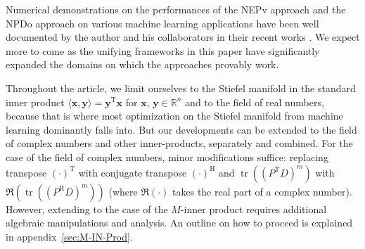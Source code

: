 \documentclass[11pt]{article}
\def\bx{\pmb{x}}
\def\by{\pmb{y}}
\def\bbR{\mathbb{R}}
\DeclareMathOperator{\tr}{tr}
\DeclareMathOperator{\HH}{H}
\DeclareMathOperator{\T}{T}
\theoremstyle{definition}
\numberwithin{equation}{section}
\begin{document}
Numerical demonstrations on the performances of the NEPv approach and the NPDo approach on various machine learning applications
have been well documented   by the author and his collaborators in
their recent works \cite{wazl:2023,wazl:2022a,zhys:2020,zhwb:2022}.
We expect more to come as the unifying frameworks in this paper have significantly expanded the domains on which the approaches provably work.

Throughout the article, we limit ourselves to the Stiefel manifold in the standard inner product
$\langle \bx,\by\rangle=\by^{\T}\bx$ for $\bx,\,\by\in\bbR^n$ and to the field of real numbers, because that is where
most optimization on the Stiefel manifold from machine learning dominantly falls into. But our developments can be extended to
the field of complex numbers and other inner-products, separately and combined.
For the case of the field of complex numbers, minor modifications suffice: replacing
        transpose $(\cdot)^{\T}$ with conjugate transpose $(\cdot)^{\HH}$ and  $\tr((P^{\T}D)^m)$ with $\Re(\tr((P^{\HH}D)^m))$
        (where $\Re(\cdot)$ takes the real part of a complex number).
However, extending to the case of the $M$-inner product requires additional algebraic manipulations and analysis. An outline on how to proceed is explained
        in appendix~\ref{sec:M-IN-Prod}.
\end{document}
